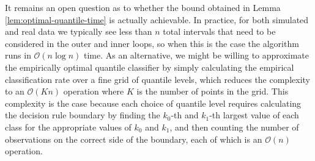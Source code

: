 It remains an open question as to whether the bound obtained in Lemma
\ref{lem:optimal-quantile-time} is actually achievable.  In practice, for both
simulated and real data we typically see less than $n$ total intervals that need
to be considered in the outer and inner loops, so when this is the case the
algorithm runs in $\mathcal{O}(n \log n)$ time.  As an alternative, we might be
willing to approximate the empirically optimal quantile classifier by simply
calculating the empirical classification rate over a fine grid of quantile
levels, which reduces the complexity to an $\mathcal{O}(Kn)$ operation where $K$
is the number of points in the grid.  This complexity is the case because each
choice of quantile level requires calculating the decision rule boundary by
finding the $k_0$-th and $k_1$-th largest value of each class for the
appropriate values of $k_0$ and $k_1$, and then counting the number of
observations on the correct side of the boundary, each of which is an
$\mathcal{O}(n)$ operation.




